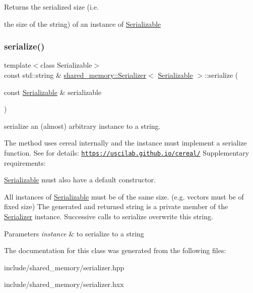 Returns the serialized size (i.\+e. 

the size of the string) of an instance of \hyperlink{classSerializable}{Serializable} \mbox{\label{classshared__memory_1_1Serializer_a61ea01a0e5e28fc24c9274455050b1c1}} 
\subsubsection{\texorpdfstring{serialize()}{serialize()}}
{\footnotesize\ttfamily template$<$class Serializable$>$ \\
const std\+::string \& \hyperlink{classshared__memory_1_1Serializer}{shared\+\_\+memory\+::\+Serializer}$<$ \hyperlink{classSerializable}{Serializable} $>$\+::serialize (\begin{DoxyParamCaption}\item[{const \hyperlink{classSerializable}{Serializable} \&}]{serializable }\end{DoxyParamCaption})}



serialize an (almost) arbitrary instance to a string. 

The method uses cereal internally and the instance must implement a serialize function. See for details\+: \href{https://uscilab.github.io/cereal/}{\tt https\+://uscilab.\+github.\+io/cereal/} Supplementary requirements\+:
\begin{DoxyItemize}
\item \hyperlink{classSerializable}{Serializable} must also have a default constructor.
\item All instances of \hyperlink{classSerializable}{Serializable} must be of the same size. (e.\+g. vectors must be of fixed size) The generated and returned string is a private member of the \hyperlink{classshared__memory_1_1Serializer}{Serializer} instance. Successive calls to serialize overwrite this string. 
\begin{DoxyParams}{Parameters}
{\em instance} & to serialize to a string \\
\hline
\end{DoxyParams}

\end{DoxyItemize}

The documentation for this class was generated from the following files\+:\begin{DoxyCompactItemize}
\item 
include/shared\+\_\+memory/serializer.\+hpp\item 
include/shared\+\_\+memory/serializer.\+hxx\end{DoxyCompactItemize}
